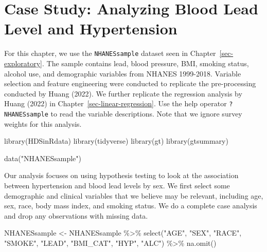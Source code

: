 \documentclass[
  letterpaper,
]{latex/krantz}
\makeatletter
\newenvironment{Shaded}{\begin{snugshade}}{\end{snugshade}}
\newcommand{\FunctionTok}[1]{\textcolor[rgb]{0.28,0.35,0.67}{#1}}
\newcommand{\NormalTok}[1]{\textcolor[rgb]{0.00,0.23,0.31}{#1}}
\newcommand{\OtherTok}[1]{\textcolor[rgb]{0.00,0.23,0.31}{#1}}
\newcommand{\SpecialCharTok}[1]{\textcolor[rgb]{0.37,0.37,0.37}{#1}}
\newcommand{\StringTok}[1]{\textcolor[rgb]{0.13,0.47,0.30}{#1}}
\newenvironment{kframe}{%
\medskip{}
\setlength{\fboxsep}{.8em}
 \def\at@end@of@kframe{}%
 \ifinner\ifhmode%
  \def\at@end@of@kframe{\end{minipage}}%
  \begin{minipage}{\columnwidth}%
 \fi\fi%
 \def\FrameCommand##1{\hskip\@totalleftmargin \hskip-\fboxsep
 \colorbox{shadecolor}{##1}\hskip-\fboxsep
     \hskip-\linewidth \hskip-\@totalleftmargin \hskip\columnwidth}%
 \MakeFramed {\advance\hsize-\width
   \@totalleftmargin\z@ \linewidth\hsize
   \@setminipage}}%
 {\par\unskip\endMakeFramed%
 \at@end@of@kframe}
\renewenvironment{Shaded}{\begin{kframe}}{\end{kframe}}
\makeatother
\begin{document}
\chapter{Case Study: Analyzing Blood Lead Level and
Hypertension}\label{sec-cs-testing}

For this chapter, we use the
\texttt{NHANESsample}
dataset seen in
Chapter~\ref{sec-exploratory}. The sample contains lead, blood pressure,
BMI, smoking status, alcohol use, and demographic variables from NHANES
1999-2018. Variable selection and feature engineering were conducted to
replicate the pre-processing conducted by Huang (2022). We further
replicate the regression analysis by Huang (2022) in
Chapter~\ref{sec-linear-regression}. Use the help operator
\texttt{?NHANESsample} to read the variable descriptions. Note that we
ignore survey weights for this analysis.

\begin{Shaded}
\begin{Highlighting}[]
\FunctionTok{library}\NormalTok{(HDSinRdata)}
\FunctionTok{library}\NormalTok{(tidyverse)}
\FunctionTok{library}\NormalTok{(gt)}
\FunctionTok{library}\NormalTok{(gtsummary)}

\FunctionTok{data}\NormalTok{(}\StringTok{"NHANESsample"}\NormalTok{)}
\end{Highlighting}
\end{Shaded}

Our analysis focuses on using hypothesis testing to look at the
association between hypertension and blood lead levels by sex. We first
select some demographic and clinical variables that we believe may be
relevant, including age, sex, race, body mass index, and smoking status.
We do a complete case analysis and drop any observations with missing
data.

\begin{Shaded}
\begin{Highlighting}[]
\NormalTok{NHANESsample }\OtherTok{\textless{}{-}}\NormalTok{ NHANESsample }\SpecialCharTok{\%\textgreater{}\%}
  \FunctionTok{select}\NormalTok{(}\StringTok{"AGE"}\NormalTok{, }\StringTok{"SEX"}\NormalTok{, }\StringTok{"RACE"}\NormalTok{, }\StringTok{"SMOKE"}\NormalTok{, }\StringTok{"LEAD"}\NormalTok{, }\StringTok{"BMI\_CAT"}\NormalTok{, }
         \StringTok{"HYP"}\NormalTok{, }\StringTok{"ALC"}\NormalTok{) }\SpecialCharTok{\%\textgreater{}\%}
  \FunctionTok{na.omit}\NormalTok{()}
\end{Highlighting}
\end{Shaded}
\end{document}
